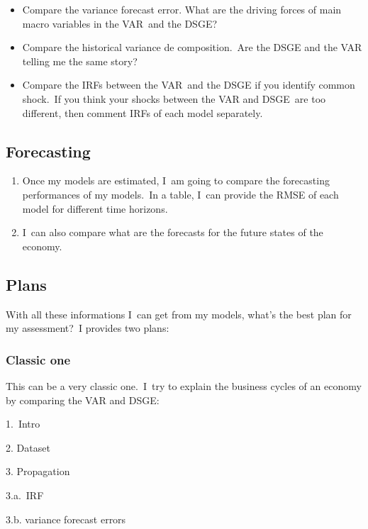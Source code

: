 \documentclass[a4paper,12pt]{article}%
\begin{document}
\begin{itemize}
\item Compare the variance forecast error. What are the driving forces of main
macro variables in the VAR\ and the DSGE?

\item Compare the historical variance de composition.\ Are the DSGE and the
VAR telling me the same story?

\item Compare the IRFs between the VAR\ and the DSGE if you identify common
shock.\ If you think your shocks between the VAR and DSGE\ are too different,
then comment IRFs of each model separately.
\end{itemize}

\subsection{Forecasting}

\begin{enumerate}
\item Once my models are estimated, I\ am going to compare the forecasting
performances of my models.\ In a table, I\ can provide the RMSE of each model
for different time horizons. 

\item I\ can also compare what are the forecasts for the future states of the economy.
\end{enumerate}

\subsection{Plans}

With all these informations I\ can get from my models, what's the best plan
for my assessment?\ I provides two plans:

\subsubsection{Classic one}

This can be a very classic one.\ I\ try to explain the business cycles of an
economy by comparing the VAR and DSGE:

1.\ Intro

2. Dataset

3. Propagation\newline

3.a.\ IRF

3.b. variance forecast errors
\end{document}
